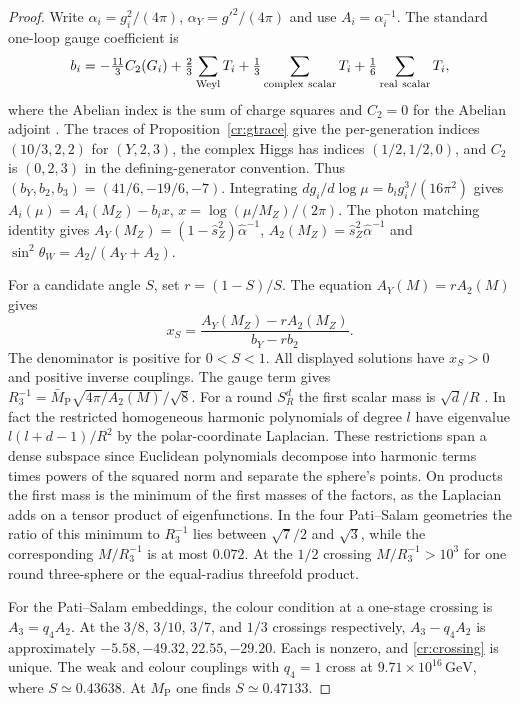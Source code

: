 \documentclass[aps,pra,onecolumn,superscriptaddress,nofootinbib,10pt]{revtex4-2}
\theoremstyle{definition}
\theoremstyle{remark}
\begin{document}
\begin{proof}
Write $\alpha_i=g_i^2/(4\pi)$, $\alpha_Y=g'^2/(4\pi)$ and use
$A_i=\alpha_i^{-1}$. The standard one-loop gauge coefficient is
\[
 b_i=-\tfrac{11}{3}C_2(G_i)
   +\tfrac23\sum_{\rm Weyl}T_i
   +\tfrac13\sum_{\rm complex\ scalar}T_i
   +\tfrac16\sum_{\rm real\ scalar}T_i ,
\]
where the Abelian index is the sum of charge squares and
$C_2=0$ for the Abelian adjoint \cite{ub:mv83,GQW}.
The traces of Proposition~\ref{cr:gtrace} give the per-generation
indices $(10/3,2,2)$ for $(Y,2,3)$, the complex Higgs has
indices $(1/2,1/2,0)$, and $C_2$ is $(0,2,3)$
in the defining-generator convention. Thus
$(b_Y,b_2,b_3)=(41/6,-19/6,-7)$. Integrating
$d g_i/d\log\mu=b_i g_i^3/(16\pi^2)$ gives
$A_i(\mu)=A_i(M_Z)-b_i x$, $x=\log(\mu/M_Z)/(2\pi)$.
The photon matching identity gives
$A_Y(M_Z)=(1-\hat s_Z^2)\hat\alpha^{-1}$,
$A_2(M_Z)=\hat s_Z^2\hat\alpha^{-1}$ and
$\sin^2\theta_W=A_2/(A_Y+A_2)$.

For a candidate angle $S$, set $r=(1-S)/S$. The equation
$A_Y(M)=r A_2(M)$ gives
\begin{equation}\label{cr:crossing}
 x_S=\frac{A_Y(M_Z)-rA_2(M_Z)}{b_Y-r b_2}.
\end{equation}
The denominator is positive for $0<S<1$. All displayed solutions
have $x_S>0$ and positive inverse couplings. The gauge term gives
$R_3^{-1}=\bar M_{\mathrm P}\sqrt{4\pi/A_2(M)}/\sqrt8$.
For a round $S^d_R$ the first scalar mass is $\sqrt d/R$
\cite[Ch.~III, sphere spectrum]{cr:chavel}. In fact the restricted
homogeneous harmonic polynomials of degree $l$ have eigenvalue
$l(l+d-1)/R^2$ by the polar-coordinate Laplacian. These
restrictions span a dense subspace since Euclidean polynomials
decompose into harmonic terms times powers of the squared norm
and separate the sphere's points. On products the first mass
is the minimum of the first masses of the factors, as the
Laplacian adds on a tensor product of eigenfunctions. In the
four Pati--Salam geometries the ratio of this minimum to
$R_3^{-1}$ lies between $\sqrt7/2$ and $\sqrt3$, while the
corresponding $M/R_3^{-1}$ is at most $0.072$.
At the $1/2$ crossing $M/R_3^{-1}>10^3$ for one round
three-sphere or the equal-radius threefold product.

For the Pati--Salam embeddings, the colour condition at a
one-stage crossing is $A_3=q_4 A_2$. At the $3/8$, $3/10$,
$3/7$, and $1/3$ crossings respectively,
$A_3-q_4A_2$ is approximately $-5.58,-49.32,22.55,-29.20$.
Each is nonzero, and \eqref{cr:crossing} is unique. The weak
and colour couplings with $q_4=1$ cross at
$9.71\times10^{16}\,\mathrm{GeV}$, where $S\simeq0.43638$.
At $M_{\mathrm P}$ one finds $S\simeq0.47133$.
\end{proof}
\end{document}
